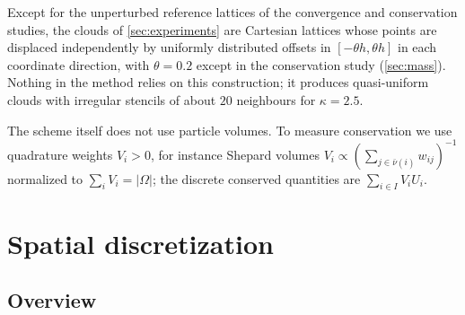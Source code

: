\documentclass[11pt,a4paper]{article}
\numberwithin{equation}{section}
\newcommand{\cnb}{\bar\nu}
\begin{document}
Except for the unperturbed reference lattices of the convergence and conservation studies, the clouds of \cref{sec:experiments} are Cartesian lattices whose points are displaced independently by uniformly distributed offsets in $[-\theta h,\theta h]$ in each coordinate direction, with $\theta=0.2$ except in the conservation study (\cref{sec:mass}). Nothing in the method relies on this construction; it produces quasi-uniform clouds with irregular stencils of about $20$ neighbours for $\kappa=2.5$.

The scheme itself does not use particle volumes. To measure conservation we use quadrature weights $V_i>0$, for instance Shepard volumes $V_i\propto(\sum_{j\in\cnb(i)}w_{ij})^{-1}$ normalized to $\sum_i V_i=|\Omega|$; the discrete conserved quantities are $\sum_{i\in I}V_iU_i$.

\section{Spatial discretization}\label{sec:method}

\subsection{Overview}\label{sec:overview}
\end{document}
